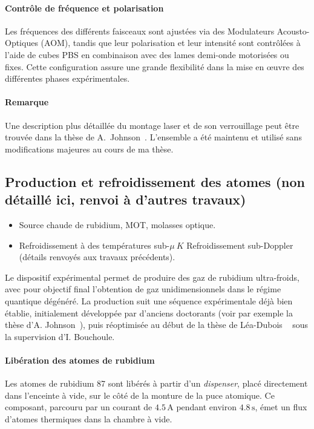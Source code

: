 \paragraph{Contrôle de fréquence et polarisation}
Les fréquences des différents faisceaux sont ajustées via des Modulateurs Acousto-Optiques (AOM), tandis que leur polarisation et leur intensité sont contrôlées à l’aide de cubes PBS en combinaison avec des lames demi-onde motorisées ou fixes. Cette configuration assure une grande flexibilité dans la mise en œuvre des différentes phases expérimentales.

\paragraph{Remarque}
Une description plus détaillée du montage laser et de son verrouillage peut être trouvée dans la thèse de A.~Johnson~\cite{Johnson2016}. L’ensemble a été maintenu et utilisé sans modifications majeures au cours de ma thèse.


\subsection{Production et refroidissement des atomes (non détaillé ici, renvoi à d'autres travaux)}
{\color{blue}
\begin{itemize}
    \item Source chaude de rubidium, MOT, molasses optique.
    \item Refroidissement à des températures sub-$\mu~K$ Refroidissement sub-Doppler (détails renvoyés aux travaux précédents).
\end{itemize}
}
Le dispositif expérimental permet de produire des gaz de rubidium ultra-froids, avec pour objectif final l’obtention de gaz unidimensionnels dans le régime quantique dégénéré. La production suit une séquence expérimentale déjà bien établie, initialement développée par d’anciens doctorants (voir par exemple la thèse d’A. Johnson~\cite{Johnson2016}), puis réoptimisée au début de la thèse de Léa-Dubois ~\cite{L.Dubois2024} sous la supervision d’I. Bouchoule.

\paragraph{Libération des atomes de rubidium}
Les atomes de rubidium 87 sont libérés à partir d’un \emph{dispenser}, placé directement dans l’enceinte à vide, sur le côté de la monture de la puce atomique. Ce composant, parcouru par un courant de \( 4.5\,\mathrm{A} \) pendant environ \( 4.8\,\mathrm{s} \), émet un flux d’atomes thermiques dans la chambre à vide.

